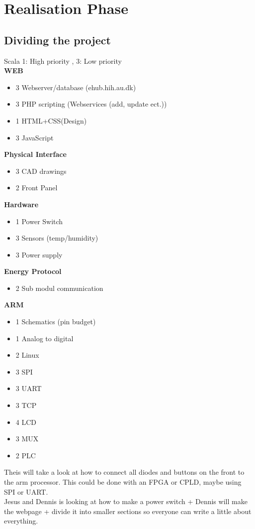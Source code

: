 \chapter{Realisation Phase}
\section{Dividing the project}
Scala 1: High priority , 3: Low priority\\
\textbf{WEB}
\begin{itemize}
	\item 3 Webserver/database (ehub.hih.au.dk)
	\item 3 PHP scripting (Webservices (add, update ect.))
	\item 1 HTML+CSS(Design)
	\item 3 JavaScript
\end{itemize}

\textbf{Physical Interface}
\begin{itemize}
	\item 3 CAD drawings
	\item 2 Front Panel
\end{itemize}

\textbf{Hardware}
\begin{itemize}
	\item 1 Power Switch
	\item 3 Sensors (temp/humidity)
	\item 3 Power supply
\end{itemize}

\textbf{Energy Protocol}
\begin{itemize}
	\item 2 Sub modul communication
\end{itemize}

\textbf{ARM}
\begin{itemize}
	\item 1 Schematics (pin budget)
	\item 1 Analog to digital
	\item 2 Linux
	\item 3 SPI
	\item 3 UART
	\item 3 TCP
	\item 4 LCD
	\item 3 MUX
	\item 2 PLC
\end{itemize}

Theis will take a look at how to connect all diodes and buttons on the front to the arm processor.
This could be done with an FPGA or CPLD, maybe using SPI or UART.
\\
Jesus and Dennis is looking at how to make a power switch + Dennis will make the webpage
+ divide it into smaller sections so everyone can write a little about everything.

